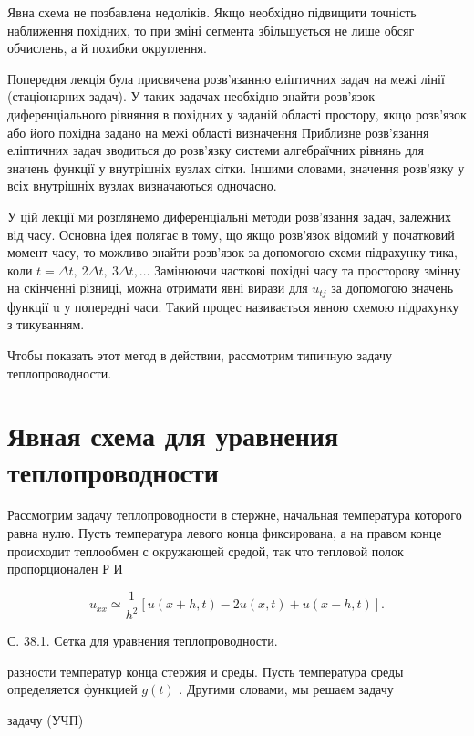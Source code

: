 \documentclass[
  ukrainian,
]{article}
\begin{document}
Явна схема не позбавлена недоліків. Якщо необхідно підвищити точність
наближення похідних, то при зміні сегмента збільшується не лише обсяг
обчислень, а й похибки округлення.

Попередня лекція була присвячена розв'язанню еліптичних задач на межі
лінії (стаціонарних задач). У таких задачах необхідно знайти розв'язок
диференціального рівняння в похідних у заданій області простору, якщо
розв'язок або його похідна задано на межі області визначення Приблизне
розв'язання еліптичних задач зводиться до розв'язку системи алгебраїчних
рівнянь для значень функції у внутрішніх вузлах сітки. Іншими словами,
значення розв'язку у всіх внутрішніх вузлах визначаються одночасно.

У цій лекції ми розглянемо диференціальні методи розв'язання задач,
залежних від часу. Основна ідея полягає в тому, що якщо розв'язок
відомий у початковий момент часу, то можливо знайти розв'язок за
допомогою схеми підрахунку тика, коли
\(t=\Delta t,\ 2\Delta t,\ 3\Delta t,\ldots\) Замінюючи часткові похідні
часу та просторову змінну на скінченні різниці, можна отримати явні
вирази для \(u_{tj}\) за допомогою значень функції u у попередні часи.
Такий процес називається явною схемою підрахунку з тикуванням.

Чтобы показать этот метод в действии, рассмотрим типичную задачу
теплопроводности.

\section{Явная схема для уравнения
теплопроводности}\label{ux44fux432ux43dux430ux44f-ux441ux445ux435ux43cux430-ux434ux43bux44f-ux443ux440ux430ux432ux43dux435ux43dux438ux44f-ux442ux435ux43fux43bux43eux43fux440ux43eux432ux43eux434ux43dux43eux441ux442ux438}

Рассмотрим задачу теплопроводности в стержне, начальная температура
которого равна нулю. Пусть температура левого конца фиксирована, а на
правом конце происходит теплообмен с окружающей средой, так что тепловой
полок пропорционален Р И

\[
u_{xx} \simeq \frac{1}{h^2} [u(x+h, t) - 2u(x, t) + u(x-h, t)].
\]

С. 38.1. Сетка для уравнения теплопроводности.

разности температур конца стержия и среды. Пусть температура среды
определяется функцией \(g\left(t\right)\) . Другими словами, мы решаем
задачу

задачу (УЧП)
\end{document}
